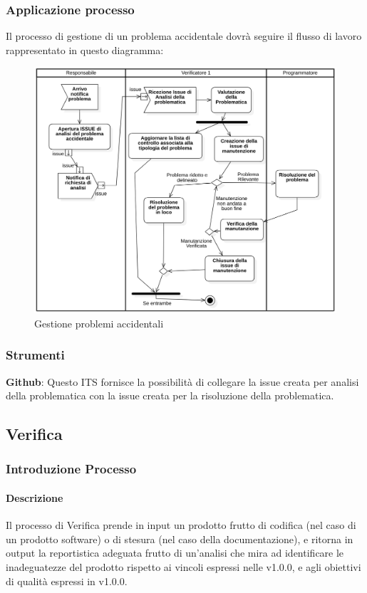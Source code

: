        \subsubsection{Applicazione processo}
            Il processo di gestione di un problema accidentale dovrà seguire il flusso di lavoro rappresentato in questo diagramma:
            \begin{figure}[H]
                    \centering
                    \includegraphics[width=1.0\textwidth]{res/images/gestione_problemi_accidentali.png}
                \caption{Gestione problemi accidentali}
                \label{Gestione problemi accidentali}
            \end{figure}
        \subsubsection{Strumenti}
            \textbf{Github}: Questo ITS fornisce la possibilità di collegare la issue creata per analisi della problematica con la issue creata per la risoluzione della problematica.

    \subsection{Verifica}
        \subsubsection{Introduzione Processo}
            \paragraph{Descrizione}
                Il processo di Verifica prende in input un prodotto frutto di codifica (nel caso di un prodotto software) o di stesura (nel caso della documentazione), e ritorna in output la reportistica adeguata frutto di un’analisi che mira ad identificare le inadeguatezze del prodotto rispetto ai vincoli espressi nelle  v1.0.0, e agli obiettivi di qualità espressi in  v1.0.0. 
